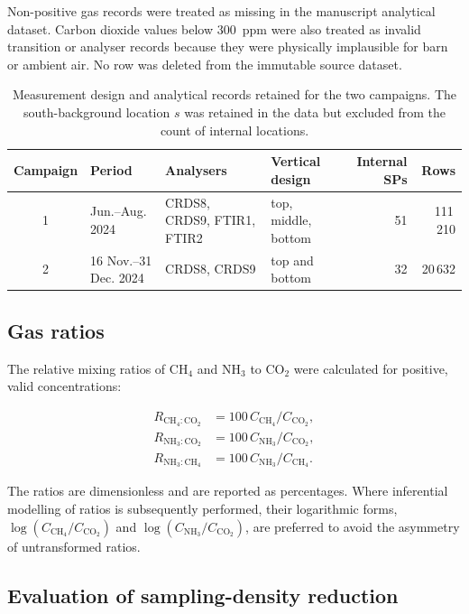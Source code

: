 \documentclass[12pt,a4paper]{article}
\begin{document}
Non-positive gas records were treated as missing in the manuscript analytical
dataset. Carbon dioxide values below \SI{300}{ppm} were also treated as
invalid transition or analyser records because they were physically
implausible for barn or ambient air. No row was deleted from the immutable
source dataset.

\begin{table}[htbp]
\centering
\caption{Measurement design and analytical records retained for the two
campaigns. The south-background location \(s\) was retained in the data but
excluded from the count of internal locations.}
\label{tab:campaigns}
\begingroup
\small
\setlength{\tabcolsep}{2.2pt}
\begin{tabular}{@{}c l
  >{\raggedright\arraybackslash}p{4.0cm}
  >{\raggedright\arraybackslash}p{2.7cm}
  r r@{}}
\toprule
Campaign & Period & Analysers & Vertical design & Internal SPs & Rows\\
\midrule
1 & Jun.--Aug. 2024 & CRDS8, CRDS9, FTIR1, FTIR2 &
top, middle, bottom & 51 & 111\,210\\
2 & 16 Nov.--31 Dec. 2024 & CRDS8, CRDS9 &
top and bottom & 32 & 20\,632\\
\bottomrule
\end{tabular}
\endgroup
\end{table}

\subsection{Gas ratios}

The relative mixing ratios of \(\mathrm{CH_4}\) and \(\mathrm{NH_3}\) to
\(\mathrm{CO_2}\) were calculated for positive, valid concentrations:

\begin{align}
R_{\mathrm{CH_4:CO_2}} &=
100\,C_{\mathrm{CH_4}}/C_{\mathrm{CO_2}},\\
R_{\mathrm{NH_3:CO_2}} &=
100\,C_{\mathrm{NH_3}}/C_{\mathrm{CO_2}},\\
R_{\mathrm{NH_3:CH_4}} &=
100\,C_{\mathrm{NH_3}}/C_{\mathrm{CH_4}}.
\end{align}

The ratios are dimensionless and are reported as percentages. Where
inferential modelling of ratios is subsequently performed, their logarithmic
forms, \(\log(C_{\mathrm{CH_4}}/C_{\mathrm{CO_2}})\) and
\(\log(C_{\mathrm{NH_3}}/C_{\mathrm{CO_2}})\), are preferred to avoid the
asymmetry of untransformed ratios.

\subsection{Evaluation of sampling-density reduction}
\end{document}
